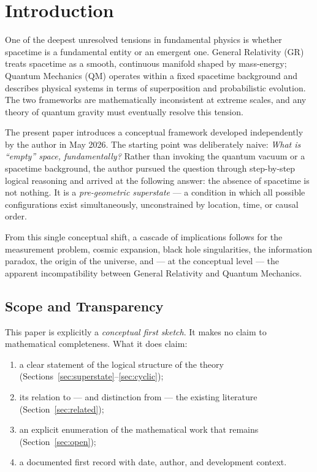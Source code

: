 \documentclass[12pt,a4paper]{article}
\begin{document}
\newpage
\tableofcontents
\newpage

\section{Introduction}
\label{sec:intro}

One of the deepest unresolved tensions in fundamental physics is
whether spacetime is a fundamental entity or an emergent one.  General
Relativity (GR) treats spacetime as a smooth, continuous manifold
shaped by mass-energy; Quantum Mechanics (QM) operates within a fixed
spacetime background and describes physical systems in terms of
superposition and probabilistic evolution.  The two frameworks are
mathematically inconsistent at extreme scales, and any theory of
quantum gravity must eventually resolve this tension.

The present paper introduces a conceptual framework developed
independently by the author in May 2026.  The starting point was
deliberately naive: \emph{What is ``empty'' space, fundamentally?}
Rather than invoking the quantum vacuum or a spacetime background,
the author pursued the question through step-by-step logical reasoning
and arrived at the following answer: the absence of spacetime is not
nothing.  It is a \emph{pre-geometric superstate} — a condition in
which all possible configurations exist simultaneously, unconstrained
by location, time, or causal order.

From this single conceptual shift, a cascade of implications follows
for the measurement problem, cosmic expansion, black hole singularities,
the information paradox, the origin of the universe, and — at the
conceptual level — the apparent incompatibility between General Relativity
and Quantum Mechanics.

\subsection{Scope and Transparency}

This paper is explicitly a \emph{conceptual first sketch}.  It makes
no claim to mathematical completeness.  What it does claim:
\begin{enumerate}[label=(\alph*)]
  \item a clear statement of the logical structure of the theory
        (Sections~\ref{sec:superstate}–\ref{sec:cyclic});
  \item its relation to — and distinction from — the existing literature
        (Section~\ref{sec:related});
  \item an explicit enumeration of the mathematical work that remains
        (Section~\ref{sec:open});
  \item a documented first record with date, author, and development
        context.
\end{enumerate}
\end{document}
